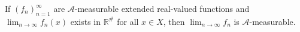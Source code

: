 If $(f_n)_{n=1}^{\infty}$ are $\mathcal{A}$-measurable extended real-valued functions and $\lim_{n \to \infty} f_n(x)$ exists in $\mathbb{R}^\#$ for all $x \in X$, then $\lim_{n \to \infty} f_n$ is $\mathcal{A}$-measurable.